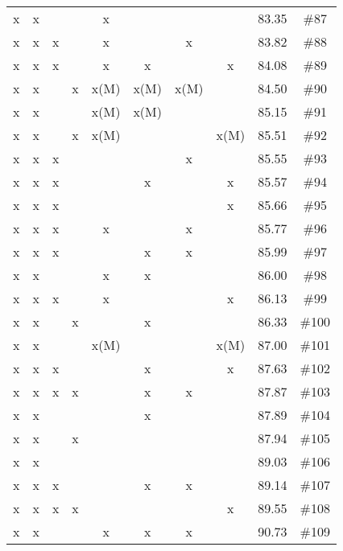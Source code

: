 \begin{longtable}{|c|c|c|c|c|c|c|c|c|c|}
 x    & x    &      &      & x    &      &      &      & 83.35 & \#87 \\
 x    & x    & x    &      & x    &      & x    &      & 83.82 & \#88 \\
 x    & x    & x    &      & x    & x    &      & x    & 84.08 & \#89 \\
 x    & x    &      & x    & x(M) & x(M) & x(M) &      & 84.50 & \#90 \\
 x    & x    &      &      & x(M) & x(M) &      &      & 85.15 & \#91 \\
 x    & x    &      & x    & x(M) &      &      & x(M) & 85.51 & \#92 \\
 x    & x    & x    &      &      &      & x    &      & 85.55 & \#93 \\
 x    & x    & x    &      &      & x    &      & x    & 85.57 & \#94 \\
 x    & x    & x    &      &      &      &      & x    & 85.66 & \#95 \\
 x    & x    & x    &      & x    &      & x    &      & 85.77 & \#96 \\
 x    & x    & x    &      &      & x    & x    &      & 85.99 & \#97 \\
 x    & x    &      &      & x    & x    &      &      & 86.00 & \#98 \\
 x    & x    & x    &      & x    &      &      & x    & 86.13 & \#99 \\
 x    & x    &      & x    &      & x    &      &      & 86.33 & \#100 \\
 x    & x    &      &      & x(M) &      &      & x(M) & 87.00 & \#101 \\
 x    & x    & x    &      &      & x    &      & x    & 87.63 & \#102 \\
 x    & x    & x    & x    &      & x    & x    &      & 87.87 & \#103 \\
 x    & x    &      &      &      & x    &      &      & 87.89 & \#104 \\
 x    & x    &      & x    &      &      &      &      & 87.94 & \#105 \\
 x    & x    &      &      &      &      &      &      & 89.03 & \#106 \\
 x    & x    & x    &      &      & x    & x    &      & 89.14 & \#107 \\
 x    & x    & x    & x    &      &      &      & x    & 89.55 & \#108 \\
 x    & x    &      &      & x    & x    & x    &      & 90.73 & \#109 \\

\end{longtable}
